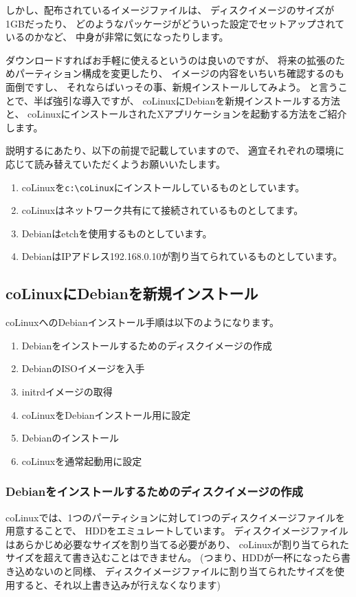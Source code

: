 \documentclass[mingoth,a4paper]{jsarticle}
\begin{document}
しかし、配布されているイメージファイルは、
ディスクイメージのサイズが1GBだったり、
どのようなパッケージがどういった設定でセットアップされているのかなど、
中身が非常に気になったりします。

ダウンロードすればお手軽に使えるというのは良いのですが、
将来の拡張のためパーティション構成を変更したり、
イメージの内容をいちいち確認するのも面倒ですし、
それならばいっその事、新規インストールしてみよう。
と言うことで、半ば強引な導入ですが、
coLinuxにDebianを新規インストールする方法と、
coLinuxにインストールされたXアプリケーションを起動する方法をご紹介します。

説明するにあたり、以下の前提で記載していますので、
適宜それぞれの環境に応じて読み替えていただくようお願いいたします。
\begin{enumerate}
\item coLinuxを\verb|c:\coLinux|にインストールしているものとしています。
\item coLinuxはネットワーク共有にて接続されているものとしてます。
\item Debianはetchを使用するものとしています。
\item DebianはIPアドレス192.168.0.10が割り当てられているものとしています。
\end{enumerate}

\subsection{coLinuxにDebianを新規インストール}
coLinuxへのDebianインストール手順は以下のようになります。
\begin{enumerate}
\item Debianをインストールするためのディスクイメージの作成
\item DebianのISOイメージを入手
\item initrdイメージの取得
\item coLinuxをDebianインストール用に設定
\item Debianのインストール
\item coLinuxを通常起動用に設定
\end{enumerate}



\subsubsection{Debianをインストールするためのディスクイメージの作成}
coLinuxでは、1つのパーティションに対して1つのディスクイメージファイルを用意することで、
HDDをエミュレートしています。
ディスクイメージファイルはあらかじめ必要なサイズを割り当てる必要があり、
coLinuxが割り当てられたサイズを超えて書き込むことはできません。
(つまり、HDDが一杯になったら書き込めないのと同様、
ディスクイメージファイルに割り当てられたサイズを使用すると、それ以上書き込みが行えなくなります)
\end{document}
